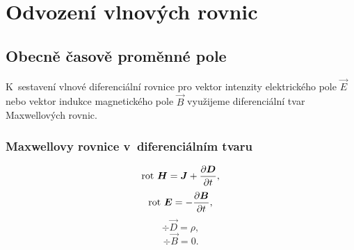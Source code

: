 
\chapter{Odvození vlnových rovnic} \label{kap:Odvozeni_VlnR}
\section{Obecně časově proměnné pole} \label{sec:Odvozeni_CasPole}
K~sestavení vlnové diferenciální rovnice pro vektor intenzity elektrického pole $\vec E$ nebo vektor indukce magnetického pole $\vec B$ využijeme diferenciální tvar Maxwellových rovnic. 
\subsection*{Maxwellovy rovnice v~diferenciálním tvaru}
\begin{equation}
	\mathrm{rot}\ \mbox{\boldmath$H$} = \mbox{\boldmath$J$}+\frac{\partial\mbox{\boldmath$D$}}{\partial t},
	\label{rce:1MaxwR}
\end{equation}
\begin{equation}
	\mathrm{rot}\ \mbox{\boldmath$E$} = -\frac{\partial\mbox{\boldmath$B$}}{\partial t},
	\label{rce:2MaxwR}
\end{equation}
\begin{equation}
	\div\vec D = \rho,
	\label{rce:3MaxwR}
\end{equation}
\begin{equation}
	\div\vec B = 0.
	\label{rce:4MaxwR}
\end{equation}

